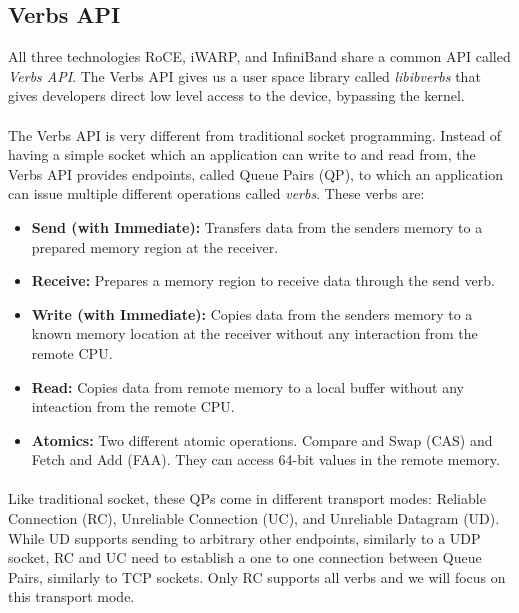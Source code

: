 \subsection{Verbs API}

All three technologies RoCE, iWARP, and InfiniBand share a common API called \emph{Verbs API}. The Verbs API gives us a
user space library called \emph{libibverbs} that gives developers direct low level access to the device, bypassing the kernel.

\paragraph{} The Verbs API is very different from traditional socket programming. Instead of having a simple socket which an 
application can write to and read from, the Verbs API provides endpoints, called Queue Pairs (QP), to which an application 
can issue multiple different operations called \emph{verbs}. These verbs are:

\begin{itemize}
  \item \textbf{Send (with Immediate):} Transfers data from the senders memory to a prepared memory region at the receiver.
  \item \textbf{Receive:} Prepares a memory region to receive data through the send verb.
  \item \textbf{Write (with Immediate):} Copies data from the senders memory to a known memory location at the receiver without any 
    interaction from the remote CPU.
  \item \textbf{Read:} Copies data from remote memory to a local buffer without any inteaction from the remote CPU.
  \item \textbf{Atomics:} Two different atomic operations. Compare and Swap (CAS) and Fetch and Add (FAA). They can access 64-bit 
    values in the remote memory. 
\end{itemize}

\paragraph{} Like traditional socket, these QPs come in different transport modes: Reliable Connection (RC),
Unreliable Connection (UC),
and Unreliable Datagram (UD). While UD supports sending to arbitrary other endpoints, similarly to a UDP socket, RC and UC 
need to establish a one to one connection between Queue Pairs, similarly to TCP sockets. Only RC supports all 
verbs and we will focus on this transport mode.


